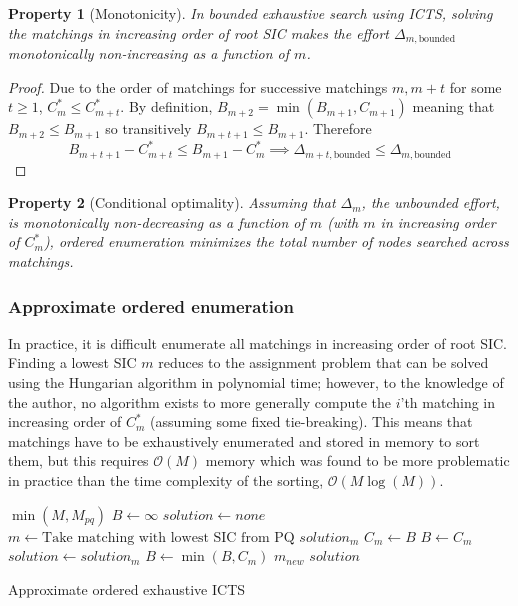 \documentclass[english,10pt]{article}
\newtheorem{property}{Property}
\begin{document}
	\begin{property}[Monotonicity]
		\label{monotonicity}
		In bounded exhaustive search using ICTS, solving the matchings in increasing order of root SIC makes the effort $\Delta_{m,\text{bounded}}$ monotonically non-increasing as a function of $m$.
	\end{property}
	\begin{proof}
		Due to the order of matchings for successive matchings $m,m+t$ for some $t\geq 1$, $C^*_{m} \leq C^*_{m+t}$. By definition, $B_{m+2} = \min(B_{m+1},C_{m+1})$ meaning that $B_{m+2} \leq B_{m + 1}$ so transitively $B_{m+t+1} \leq B_{m+1}$. Therefore
		\[B_{m+t+1} - C^*_{m+t}\leq B_{m+1} - C^*_m\implies \Delta_{m+t,\text{bounded}} \leq \Delta_{m,\text{bounded}}\]
	\end{proof}
	\begin{property}[Conditional optimality]
		\label{cond-monoton-optim}
		Assuming that $\Delta_m$, the unbounded effort, is monotonically non-decreasing as a function of $m$ (with $m$ in increasing order of $C^*_m$), ordered enumeration minimizes the total number of nodes searched across matchings.
	\end{property}
	\subsubsection{Approximate ordered enumeration}
	In practice, it is difficult enumerate all matchings in increasing order of root SIC. Finding a lowest SIC $m$ reduces to the assignment problem that can be solved using the Hungarian algorithm \cite{kuhn55} in polynomial time; however, to the knowledge of the author, no algorithm exists to more generally compute the $i$'th matching in increasing order of $C^*_m$ (assuming some fixed tie-breaking). This means that matchings have to be exhaustively enumerated and stored in memory to sort them, but this requires $\mathcal{O}(M)$ memory which was found to be more problematic in practice than the time complexity of the sorting, $\mathcal{O}(M\log(M))$.
	
	\begin{algorithm}
		\begin{algorithmic}[1]
			\State {}$\min(M,M_{pq})$
			\State $B \gets \infty$
			\State $solution \gets none$
			\Repeat
			\State $m\gets\text{Take matching with lowest SIC from PQ}$
			\State $solution_m$  $C_m\gets$$B$ 
			\State $B\gets C_m$
			\State $solution \gets solution_m$
			\EndIf
			\State $B\gets\min(B,C_m)$
			\State {}$m_{new}$
			\EndIf
			\Return $solution$
		\end{algorithmic}
		\caption{Approximate ordered exhaustive ICTS} 
		\label{pq-algo}
	\end{algorithm}
	
\end{document}
